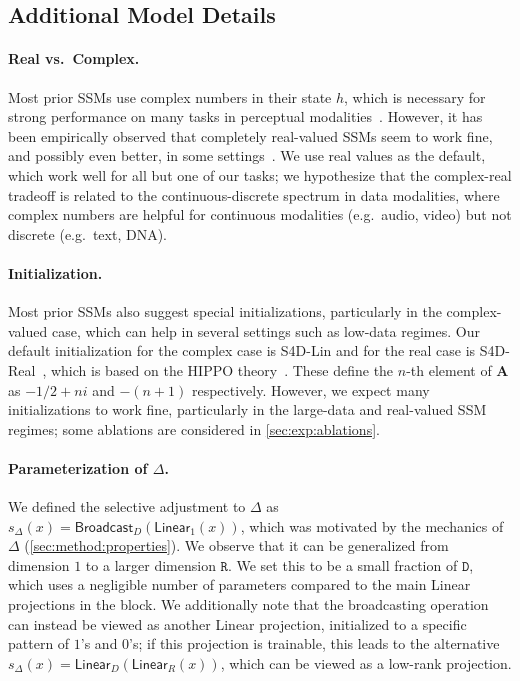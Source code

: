 \subsection{Additional Model Details}
\label{sec:method:details}

\paragraph{Real vs.\ Complex.} Most prior SSMs use complex numbers in their state $h$, which is necessary for strong performance on many tasks in perceptual modalities~\citep{gu2022efficiently}.
However, it has been empirically observed that completely real-valued SSMs seem to work fine, and possibly even better, in some settings~\citep{ma2023mega}.
We use real values as the default, which work well for all but one of our tasks; we hypothesize that the complex-real tradeoff is related to the continuous-discrete spectrum in data modalities, where complex numbers are helpful for continuous modalities (e.g.\ audio, video) but not discrete (e.g.\ text, DNA).

\paragraph{Initialization.}
Most prior SSMs also suggest special initializations, particularly in the complex-valued case, which can help in several settings such as low-data regimes. Our default initialization for the complex case is S4D-Lin and for the real case is S4D-Real~\citep{gu2022parameterization},
which is based on the HIPPO theory~\citep{gu2020hippo}.
These define the $n$-th element of $\bm{A}$ as $-1/2 + n i$ and $-(n+1)$ respectively. However, we expect many initializations to work fine, particularly in the large-data and real-valued SSM regimes; some ablations are considered in \ref{sec:exp:ablations}.

\paragraph{Parameterization of $\Delta$.}
We defined the selective adjustment to $\Delta$ as $s_\Delta(x) = \mathsf{Broadcast}_D(\mathsf{Linear}_1(x))$,
which was motivated by the mechanics of $\Delta$ (\ref{sec:method:properties}).
We observe that it can be generalized from dimension $1$ to a larger dimension $\mathtt{R}$.
We set this to be a small fraction of $\mathtt{D}$,
which uses a negligible number of parameters compared to the main Linear projections in the block. We additionally note that the broadcasting operation can instead be viewed as another Linear projection, initialized to a specific pattern of $1$'s and $0$'s; if this projection is trainable, this leads to the alternative $s_\Delta(x) = \mathsf{Linear}_D(\mathsf{Linear}_R(x))$, which can be viewed as a low-rank projection.

